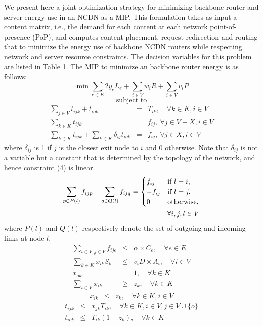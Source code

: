 We present here a joint optimization strategy for minimizing backbone router and server energy use in an NCDN as a MIP. 
This formulation takes as input a content matrix, i.e., the demand for each content at each network point-of-presence (PoP), and  computes content placement, request redirection and routing that to minimize the energy use of backbone NCDN routers while respecting network and server resource constraints.
The decision variables for this problem are listed in  Table 1. The MIP to minimize an backbone router energy is as follows:
\begin{equation}
\min  \sum_{e \in E} 2 y_e L_e   + \sum_{i \in V} w_i R + \sum_{i \in V} v_i P 
\end{equation}
\begin{equation*}
\mbox{subject to}
\end{equation*}
\begin{eqnarray}
\sum_{j \in V }  t_{ijk} +   t_{iok} &=& T_{ik}, \quad \forall k \in K, i \in V\\
\sum_{k \in K} t_{ijk} &=& f_{ij} ,  \ \forall j \in V-X, i \in V\\
\sum_{k \in K} t_{ijk} + \sum_{k \in K} \delta_{ij}  t_{iok} &=& f_{ij} ,  \ \forall j \in X, i \in V
\end{eqnarray}
where $\delta_{ij}$ is 1 if $j$ is the closest exit node to $i$ and 0 otherwise. Note that $\delta_{ij}$ is not a variable but a constant that is determined by the topology of the network, and hence constraint (4) is linear.
\begin{eqnarray}
 \sum_{p \in P(l)} f_{ijp} - \sum_{q \in Q(l)}  f_{ijq}  =  \begin{cases}  f_{ij} & \text{if } l=i,  \notag \\
   -f_{ij}  &   \text{if } l=j,  \notag \\
0 & \text{otherwise}, \end{cases}\\
\forall i,j,l \in V
\end{eqnarray}
where $P(l)$ and $Q(l)$ respectively denote the set of outgoing and incoming links at node $l$.
\begin{eqnarray}
 \sum_{i \in V, j \in V} f_{ije} &\leq& \alpha \times C_e, \quad \forall e \in E\\
 \sum_{k \in K}  x_{ik}S_k &\leq& v_i D \times A_i , \quad \forall i \in V\\
x_{ok} &=& 1, \quad \forall  k \in K \\
\sum_{i \in V}  x_{ik} &\geq& z_k, \quad \forall k \in K 
\end{eqnarray}
 \begin{eqnarray}
x_{ik} &\leq& z_k, \quad \forall k \in K, i \in V  
\end{eqnarray}
\vspace{-0.25in}
\begin{eqnarray}
t_{ijk} &\leq&  x_{jk} T_{ik},  \quad \forall k \in K,  i \in V, j \in V \cup \{o\}\\
t_{iok} &\leq& T_{ik}(1 - z_k), \quad  \forall   k \in K 
\end{eqnarray}
\vspace{-0.25in}

